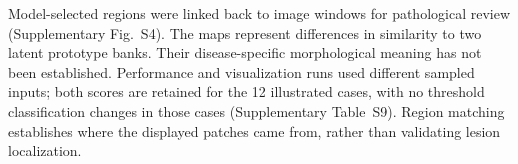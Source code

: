 Model-selected regions were linked back to image windows for pathological review (Supplementary Fig.~S4). The maps represent differences in similarity to two latent prototype banks. Their disease-specific morphological meaning has not been established. Performance and visualization runs used different sampled inputs; both scores are retained for the 12 illustrated cases, with no threshold classification changes in those cases (Supplementary Table~S9). Region matching establishes where the displayed patches came from, rather than validating lesion localization.

